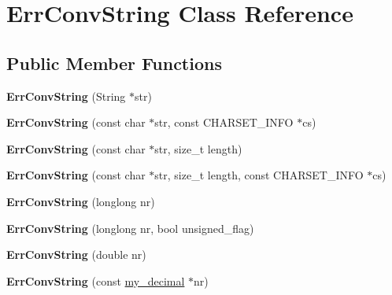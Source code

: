 \hypertarget{classErrConvString}{}\section{Err\+Conv\+String Class Reference}
\label{classErrConvString}
\subsection*{Public Member Functions}
\begin{DoxyCompactItemize}
\item 
\mbox{\label{classErrConvString_aa5bad592ff32769db0f553baa9c5a8b1}} 
{\bfseries Err\+Conv\+String} (String $\ast$str)
\item 
\mbox{\label{classErrConvString_a1acee0249ce36a9a560efe3443f03eaa}} 
{\bfseries Err\+Conv\+String} (const char $\ast$str, const C\+H\+A\+R\+S\+E\+T\+\_\+\+I\+N\+FO $\ast$cs)
\item 
\mbox{\label{classErrConvString_a2602f52c9cb67d9ad162e21c621ca884}} 
{\bfseries Err\+Conv\+String} (const char $\ast$str, size\+\_\+t length)
\item 
\mbox{\label{classErrConvString_add47253dcf25d294218d4a50ae6bbf97}} 
{\bfseries Err\+Conv\+String} (const char $\ast$str, size\+\_\+t length, const C\+H\+A\+R\+S\+E\+T\+\_\+\+I\+N\+FO $\ast$cs)
\item 
\mbox{\label{classErrConvString_a8c56c225939ee23458b4e857ded110ed}} 
{\bfseries Err\+Conv\+String} (longlong nr)
\item 
\mbox{\label{classErrConvString_ae1df9e1c378f35efe5476fc1924c10d7}} 
{\bfseries Err\+Conv\+String} (longlong nr, bool unsigned\+\_\+flag)
\item 
\mbox{\label{classErrConvString_a01bb7cb92962d02cdabf8a2348f6e259}} 
{\bfseries Err\+Conv\+String} (double nr)
\item 
\mbox{\label{classErrConvString_a0e39865fdd37ad1d920ca104431af139}} 
{\bfseries Err\+Conv\+String} (const \mbox{\hyperlink{classmy__decimal}{my\+\_\+decimal}} $\ast$nr)

\end{DoxyCompactItemize}
